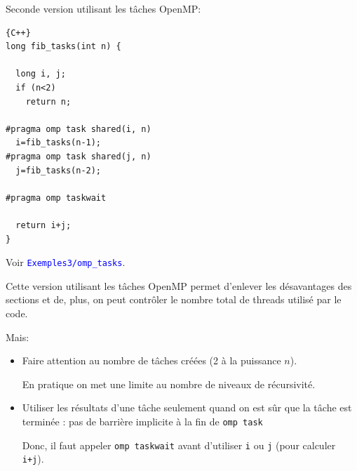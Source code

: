\documentclass{beamer}
\begin{document}
\begin{frame}[fragile]
	Seconde version utilisant les tâches OpenMP:
	
	
\begin{lstlisting}{C++}
long fib_tasks(int n) {
	
  long i, j;
  if (n<2)
    return n;

#pragma omp task shared(i, n)
  i=fib_tasks(n-1);
#pragma omp task shared(j, n)
  j=fib_tasks(n-2);
		
#pragma omp taskwait
		
  return i+j;
}
\end{lstlisting}

\end{frame}

\begin{frame}
	
\vfill

Voir {\tt\textcolor{blue}{Exemples3/omp\_tasks}}.

\vfill
Cette version utilisant les tâches OpenMP permet d'enlever les désavantages des sections et de, plus, on peut contrôler le nombre total de threads utilisé par le code.

\vfill
Mais:
\begin{itemize}
	\item Faire attention au nombre de tâches créées (2 à la puissance $n$).

	En pratique on met une limite au nombre de niveaux de récursivité.
	
\vfill
	\item Utiliser les résultats d'une tâche seulement quand on est sûr que la tâche est terminée : pas de barrière implicite à la fin de {\tt omp task}
	
	Donc, il faut appeler {\tt omp taskwait} avant d'utiliser {\tt i} ou {\tt j} (pour calculer {\tt i+j}).
\end{itemize}

\end{frame}
\end{document}
